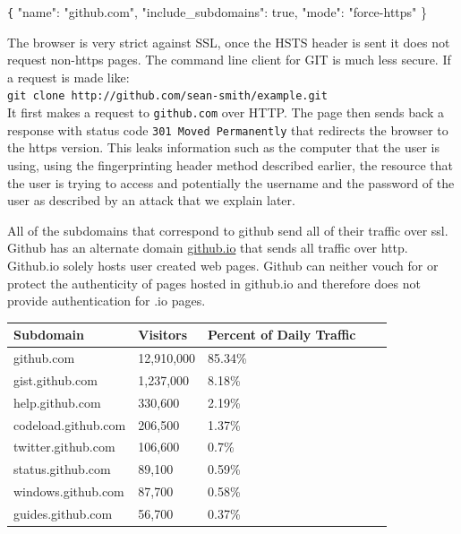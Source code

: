 \documentclass[12pt]{article}
\makeatletter
\renewcommand{\tt}[1]{\texttt{#1}}
\renewenvironment{figure}
               {\def\@captype {figure}}
               {}
\renewenvironment{table}
               {\def\@captype {table}}
               {}
\makeatother
\begin{document}
{\tt \{ "name": "github.com", "include\_subdomains": true, "mode": "force-https" \}}

The browser is very strict against SSL, once the HSTS header is sent it does not request non-https pages. The command line client for GIT is much less secure. If a request is made like:\\ \tt{git clone http://github.com/sean-smith/example.git}\\ It first makes a request to \tt{github.com} over HTTP. The page then sends back a response with status code \tt{301 Moved Permanently} that redirects the browser to the https version. This leaks information such as the computer that the user is using, using the fingerprinting header method described earlier, the resource that the user is trying to access and potentially the username and the password of the user as described by an attack that we explain later.


All of the subdomains that correspond to github send all of their traffic over ssl. Github has an alternate domain \url{github.io} that sends all traffic over http. Github.io solely hosts user created web pages. Github can neither vouch for or protect the authenticity of pages hosted in github.io and therefore does not provide authentication for .io pages.  \\

\begin{figure}
\begin{table}
\begin{tabular}{| l | l | l | l | l | }
\hline

\textbf{Subdomain} & \textbf{Visitors} & \textbf{Percent of Daily Traffic} \\ \hline
github.com & 12,910,000 & 85.34\% \\ \hline
gist.github.com & 1,237,000 & 8.18\%  \\ \hline
help.github.com & 330,600 & 2.19\%  \\ \hline
codeload.github.com & 206,500 & 1.37\%  \\ \hline
twitter.github.com & 106,600 & 0.7\%  \\ \hline
status.github.com & 89,100 & 0.59\%  \\ \hline
windows.github.com & 87,700 & 0.58\%  \\ \hline
guides.github.com & 56,700 & 0.37\%  \\ \hline
\end{tabular}
\end{table}\\
\centering
\caption{Subdomains\newline}
\label{fig:mig_over}
\end{figure}
\end{document}
